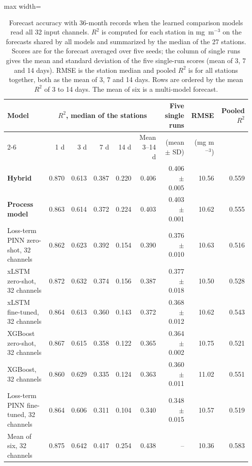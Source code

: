 \begin{table}[tbp]
\centering
\caption{Forecast accuracy with 36-month records when the learned comparison models read all 32 input channels. $R^2$ is computed for each station in mg~m$^{-3}$ on the forecasts shared by all models and summarized by the median of the 27 stations. Scores are for the forecast averaged over five seeds; the column of single runs gives the mean and standard deviation of the five single-run scores (mean of 3, 7 and 14 days). RMSE is the station median and pooled $R^2$ is for all stations together, both as the mean of 3, 7 and 14 days. Rows are ordered by the mean $R^2$ of 3 to 14 days. The mean of six is a multi-model forecast.}
\label{tab:S_accuracy32}
\footnotesize
\setlength{\tabcolsep}{4pt}
\begin{adjustbox}{max width=\textwidth}
\begin{tabular}{lrrrrrrrr}
\toprule
Model & \multicolumn{5}{c}{$R^2$, median of the stations} & Five single runs & RMSE & Pooled $R^2$ \\ \cmidrule(lr){2-6}
 & 1 d & 3 d & 7 d & 14 d & Mean 3--14 d & (mean $\pm$ SD) & (mg m$^{-3}$) & \\
\midrule
\textbf{Hybrid} & 0.870 & 0.613 & 0.387 & 0.220 & 0.406 & 0.406 $\pm$ 0.005 & 10.56 & 0.559 \\
\textbf{Process model} & 0.863 & 0.614 & 0.372 & 0.224 & 0.403 & 0.403 $\pm$ 0.001 & 10.62 & 0.555 \\
Loss-term PINN zero-shot, 32 channels & 0.862 & 0.623 & 0.392 & 0.154 & 0.390 & 0.376 $\pm$ 0.010 & 10.63 & 0.516 \\
xLSTM zero-shot, 32 channels & 0.872 & 0.632 & 0.374 & 0.156 & 0.387 & 0.377 $\pm$ 0.018 & 10.50 & 0.528 \\
xLSTM fine-tuned, 32 channels & 0.864 & 0.613 & 0.360 & 0.143 & 0.372 & 0.368 $\pm$ 0.012 & 10.62 & 0.543 \\
XGBoost zero-shot, 32 channels & 0.867 & 0.615 & 0.358 & 0.122 & 0.365 & 0.364 $\pm$ 0.002 & 10.75 & 0.521 \\
XGBoost, 32 channels & 0.860 & 0.629 & 0.335 & 0.124 & 0.363 & 0.360 $\pm$ 0.011 & 11.02 & 0.551 \\
Loss-term PINN fine-tuned, 32 channels & 0.864 & 0.606 & 0.311 & 0.104 & 0.340 & 0.348 $\pm$ 0.015 & 10.57 & 0.519 \\
\midrule
Mean of six, 32 channels & 0.875 & 0.642 & 0.417 & 0.254 & 0.438 & -- & 10.36 & 0.583 \\
\bottomrule
\end{tabular}
\end{adjustbox}
\end{table}
